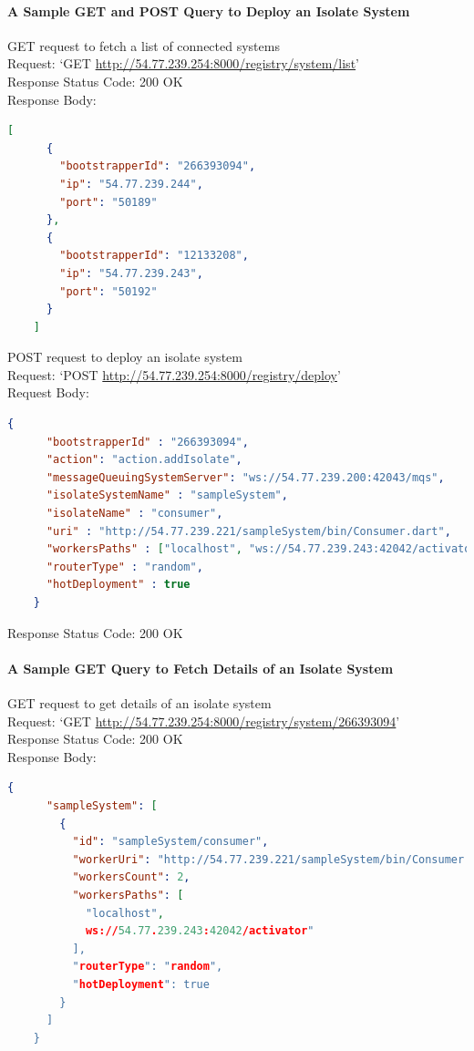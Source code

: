 \paragraph{A Sample GET and POST Query to Deploy an Isolate System}
\begin{description}
  \item{GET request to fetch a list of connected systems}\\
  Request: ‘GET \url{http://54.77.239.254:8000/registry/system/list}’\\
  Response Status Code: 200 OK\\
  Response Body:
  \begin{lstlisting}[language=json,firstnumber=1]
    [
      {
        "bootstrapperId": "266393094",
        "ip": "54.77.239.244",
        "port": "50189"
      },
      {
        "bootstrapperId": "12133208",
        "ip": "54.77.239.243",
        "port": "50192"
      }
    ]
  \end{lstlisting}

  \item{POST request to deploy an isolate system}\\
  Request: ‘POST \url{http://54.77.239.254:8000/registry/deploy}’\\
  Request Body:
  \begin{lstlisting}[language=json,firstnumber=1]
    {
      "bootstrapperId" : "266393094",
      "action": "action.addIsolate",
      "messageQueuingSystemServer": "ws://54.77.239.200:42043/mqs",
      "isolateSystemName" : "sampleSystem",
      "isolateName" : "consumer",
      "uri" : "http://54.77.239.221/sampleSystem/bin/Consumer.dart",
      "workersPaths" : ["localhost", "ws://54.77.239.243:42042/activator"],
      "routerType" : "random",
      "hotDeployment" : true
    }
  \end{lstlisting}
  Response Status Code: 200 OK
\end{description}

\paragraph{A Sample GET Query to Fetch Details of an Isolate System}
  \begin{description}
    \item{GET request to get details of an isolate system}\\
    Request: ‘GET \url{http://54.77.239.254:8000/registry/system/266393094}’\\
    Response Status Code: 200 OK\\
    Response Body:
    \begin{lstlisting}[language=json,firstnumber=1]
    {
      "sampleSystem": [
        {
          "id": "sampleSystem/consumer",
          "workerUri": "http://54.77.239.221/sampleSystem/bin/Consumer.dart",
          "workersCount": 2,
          "workersPaths": [
            "localhost",
            ws://54.77.239.243:42042/activator"
          ],
          "routerType": "random",
          "hotDeployment": true
        }
      ]
    }
  \end{lstlisting}
  \end{description}


